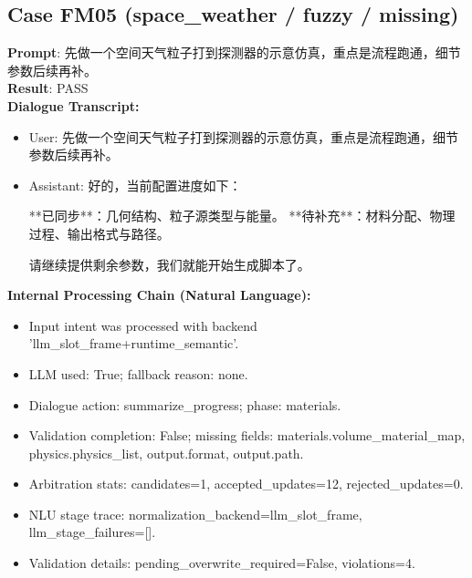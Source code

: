 \documentclass[11pt]{ctexart}
\begin{document}
\subsection{Case FM05 (space\_weather / fuzzy / missing)}
\textbf{Prompt}: 先做一个空间天气粒子打到探测器的示意仿真，重点是流程跑通，细节参数后续再补。\\
\textbf{Result}: PASS\\
\textbf{Dialogue Transcript:}
\begin{itemize}
\item User: 先做一个空间天气粒子打到探测器的示意仿真，重点是流程跑通，细节参数后续再补。
\item Assistant: 好的，当前配置进度如下：

**已同步**：几何结构、粒子源类型与能量。
**待补充**：材料分配、物理过程、输出格式与路径。

请继续提供剩余参数，我们就能开始生成脚本了。
\end{itemize}
\textbf{Internal Processing Chain (Natural Language):}
\begin{itemize}
\item Input intent was processed with backend 'llm\_slot\_frame+runtime\_semantic'.
\item LLM used: True; fallback reason: none.
\item Dialogue action: summarize\_progress; phase: materials.
\item Validation completion: False; missing fields: materials.volume\_material\_map, physics.physics\_list, output.format, output.path.
\item Arbitration stats: candidates=1, accepted\_updates=12, rejected\_updates=0.
\item NLU stage trace: normalization\_backend=llm\_slot\_frame, llm\_stage\_failures=[].
\item Validation details: pending\_overwrite\_required=False, violations=4.
\end{itemize}
\end{document}
